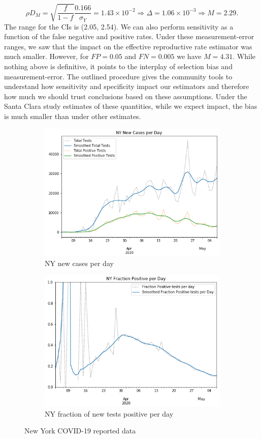 \documentclass[aoas]{amsart}
\begin{document}
\[
\rho D_M = \sqrt{\frac{f}{1-f}} \frac{\text{0.166}}{\sigma_Y} = 1.43 \times 10^{-2} \Rightarrow \Delta = 1.06 \times 10^{-3} \Rightarrow M = 2.29.
\]
The range for the CIs is (2.05, 2.54).  We can also perform sensitivity as a function of the false negative and positive rates.  Under these measurement-error ranges, we saw that the impact on the effective reproductive rate estimator was much smaller.  However, for $FP = 0.05$ and $FN = 0.005$ we have $M = 4.31$.  While nothing above is definitive, it points to the interplay of selection bias and measurement-error.  The outlined procedure gives the community tools to understand how sensitivity and specificity impact our estimators and therefore how much we should trust conclusions based on these assumptions.  Under the Santa Clara study estimates of these quantities, while we expect impact, the bias is much smaller than under other estimates.

\begin{figure}
\centering
\begin{subfigure}{.5\textwidth}
  \centering
  \includegraphics[width=.9\linewidth]{../methods/figs/NY_casecount.png}
  \caption{NY new cases per day}
  \label{fig:sub1}
\end{subfigure}%
\begin{subfigure}{.5\textwidth}
  \centering
  \includegraphics[width=.9\linewidth]{../methods/figs/NY_fracpos.png}
  \caption{NY fraction of new tests positive per day}
  \label{fig:sub2}
\end{subfigure}
\caption{New York COVID-19 reported data }
\label{fig:test}
\end{figure}
\end{document}
